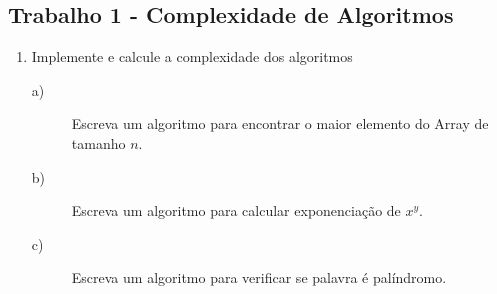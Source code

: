 \documentclass{beamer}
\newcounter{saveenumi}
\newcommand{\seti}{\setcounter{saveenumi}{\value{enumi}}}
\begin{document}
%
%
%
%
%

%

\subsection{Trabalho 1 - Complexidade de Algoritmos}
\begin{frame}
 \begin{enumerate}
  \item Implemente e calcule a complexidade dos algoritmos
\begin{description}
 \item[a)] Escreva um algoritmo para encontrar o maior elemento do
Array de tamanho $n$.
 \item[b)] Escreva um algoritmo para calcular exponenciação de $x^{y}$.
 \item[c)] Escreva um algoritmo para verificar se palavra é palíndromo.
 \end{description}
  \seti
 \end{enumerate}

\end{frame}
\end{document}
